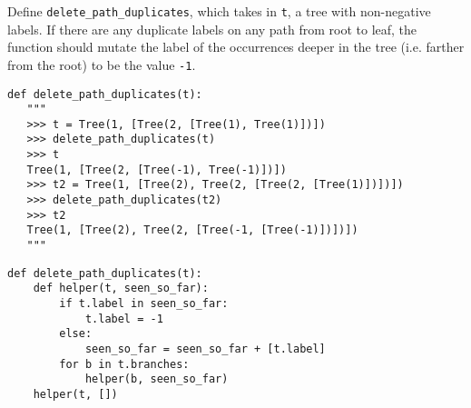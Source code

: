 \begin{blocksection}
\question
Define \texttt{delete\_path\_duplicates}, which takes in \texttt{t}, a tree
with non-negative labels. If there are any duplicate labels on any path 
from root to leaf, the function should mutate the label of the occurrences
deeper in the tree (i.e. farther from the root) to be the value \texttt{-1}.

\begin{lstlisting}
def delete_path_duplicates(t):
   """
   >>> t = Tree(1, [Tree(2, [Tree(1), Tree(1)])])
   >>> delete_path_duplicates(t)
   >>> t
   Tree(1, [Tree(2, [Tree(-1), Tree(-1)])])
   >>> t2 = Tree(1, [Tree(2), Tree(2, [Tree(2, [Tree(1)])])])
   >>> delete_path_duplicates(t2)
   >>> t2
   Tree(1, [Tree(2), Tree(2, [Tree(-1, [Tree(-1)])])])
   """
\end{lstlisting}

\begin{solution}[2in]
\begin{lstlisting}
def delete_path_duplicates(t):
    def helper(t, seen_so_far):
        if t.label in seen_so_far:
            t.label = -1
        else:
            seen_so_far = seen_so_far + [t.label]
        for b in t.branches:
            helper(b, seen_so_far)
    helper(t, [])
\end{lstlisting}
\end{solution}
\end{blocksection}